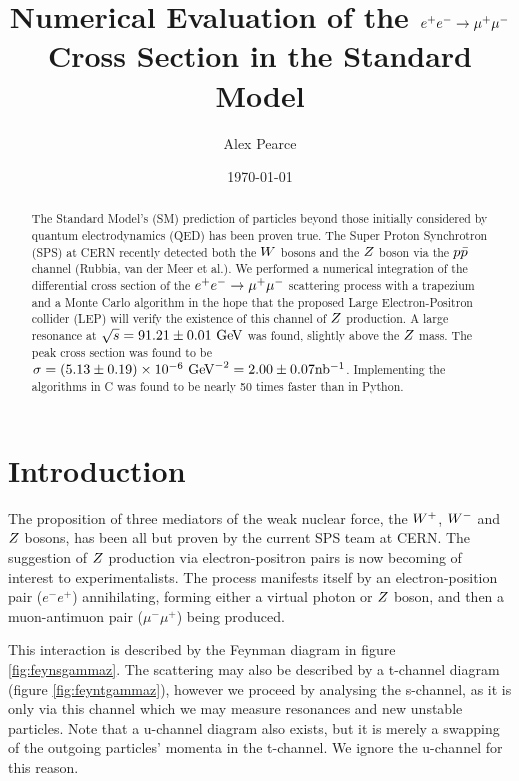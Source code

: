 \documentclass[]{article}
\providecommand{\e}[1]{\ensuremath{\times 10^{#1}}}
\begin{document}
\title{Numerical Evaluation of the $e^+ e^-  \rightarrow \mathrm{\mu^+ \mu^-} $ Cross Section in the Standard Model}
\author{Alex Pearce}
\date{\today}
\maketitle


\begin{abstract}
The Standard Model's (SM) prediction of particles beyond those initially considered by quantum electrodynamics (QED) has been proven true. The Super Proton Synchrotron (SPS) at CERN recently detected both the $W $ bosons and the $Z $ boson via the $p\bar{p}$ channel (Rubbia, van der Meer et al.). We performed a numerical integration of the differential cross section of the $e^+ e^-  \rightarrow \mathrm{\mu^+ \mu^-} $ scattering process with a trapezium and a Monte Carlo algorithm in the hope that the proposed Large Electron-Positron collider (LEP) will verify the existence of this channel of $Z $ production. A large resonance at $\sqrt{s}=91.21\pm0.01\GeV$ was found, slightly above the $Z $ mass. The peak cross section was found to be $\sigma=(5.13\pm0.19)\e{-6}\GeV^{-2}=2.00\pm0.07\inb$. Implementing the algorithms in C was found to be nearly 50 times faster than in Python.
\end{abstract}


\section{Introduction}\label{sec:intro}

The proposition of three mediators of the weak nuclear force, the $W^+ $, $W^- $ and $Z $ bosons, has been all but proven by the current SPS team at CERN. The suggestion of $Z $ production via electron-positron pairs is now becoming of interest to experimentalists. The process manifests itself by an electron-position pair ($e^{-}e^{+}$) annihilating, forming either a virtual photon or $Z $ boson, and then a muon-antimuon pair ($\mu^{-}\mu^{+}$) being produced.

This interaction is described by the Feynman diagram in figure \ref{fig:feynsgammaz}. The scattering may also be described by a t-channel diagram (figure \ref{fig:feyntgammaz}), however we proceed by analysing the s-channel, as it is only via this channel which we may measure resonances and new unstable particles. Note that a u-channel diagram also exists, but it is merely a swapping of the outgoing particles' momenta in the t-channel. We ignore the u-channel for this reason.
\end{document}
